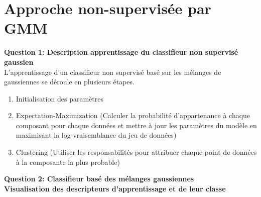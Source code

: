 \section{Approche non-supervisée par GMM}

\textbf{Question 1: Description apprentissage du classifieur non supervisé gaussien} \\

L'apprentissage d'un classifieur non supervisé basé sur les mélanges de gaussiennes se déroule en plusieurs étapes.

\begin{enumerate}
    \item Initialisation des paramètres
    \item Expectation-Maximization (Calculer la probabilité d'appartenance à chaque composant pour chaque données et mettre à jour les paramètres du modèle en maximisant la log-vraisemblance du jeu de données)
    \item Clustering (Utiliser les responsabilités pour attribuer chaque point de données à la composante la plus probable)
\end{enumerate}




\clearpage 

\textbf{Question 2: Classifieur basé des mélanges gaussiennes} \\

\textbf{Visualisation des descripteurs d’apprentissage et de leur classe} \\

